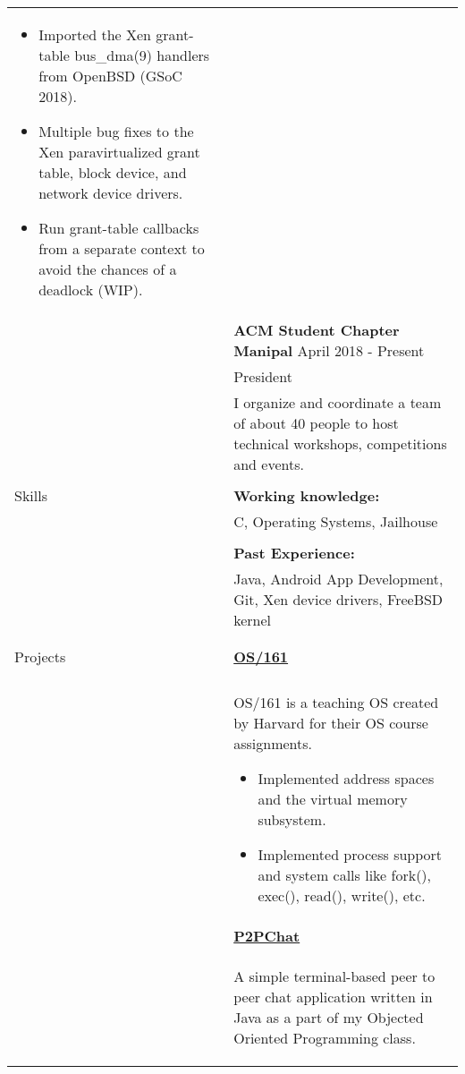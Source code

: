 \documentclass[letterpaper,11pt,oneside]{article}
\begin{document}
\begin{tabularx}{\textwidth}{l X}
    \begin{itemize}[label={--}]
        \setlength\itemsep{-0.25em}
            \item Imported the Xen grant-table bus\_dma(9) handlers from OpenBSD (GSoC 2018).
            \item Multiple bug fixes to the Xen paravirtualized grant table, block device, and network device drivers.
            \item Run grant-table callbacks from a separate context to avoid the chances of a deadlock (WIP).
    \end{itemize} \\
    & \textbf{ACM Student Chapter Manipal} \hfill April 2018 -  Present \\
    & President \\
    & I organize and coordinate a team of about 40 people to host technical workshops, competitions and events. \\
    & \\
 \Large{Skills} & \textbf{Working knowledge:} \\
    & C, Operating Systems, Jailhouse \\
    & \\
    & \textbf{Past Experience:} \\
    & Java, Android App Development, Git, Xen device drivers, FreeBSD kernel \\
    & \\
    & \\
 \Large{Projects} \vspace{-1.5ex} & \textbf{\href{https://github.com/prati0100/OS161}{OS/161}} \\
    \\
    & OS/161 is a teaching OS created by Harvard for their OS course assignments. \vspace{-0.75ex}
    \begin{itemize}[label={--}]
    \setlength\itemsep{-0.25em}
        \item Implemented address spaces and the virtual memory subsystem.
        \item Implemented process support and system calls like fork(), exec(), read(), write(), etc.
    \end{itemize} \\
    \vspace{-2.5ex} &  \textbf{\href{https://github.com/prati0100/P2PChat}{P2PChat}} \\
    \vspace{-3ex} & \begin{adjustwidth}{}{}A simple terminal-based peer to peer chat application written in Java as a part of my Objected Oriented Programming class.\end{adjustwidth} \\

\end{tabularx}
\end{document}
